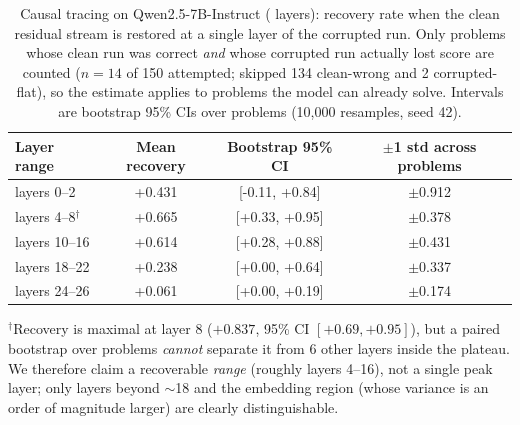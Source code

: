 \begin{table}[t]
  \centering
  \caption{Causal tracing on Qwen2.5-7B-Instruct (\nbLayers{} layers): recovery rate
           when the clean residual stream is restored at a single layer of the corrupted
           run. Only problems whose clean run was correct \emph{and} whose corrupted run
           actually lost score are counted ($n=14$ of 150 attempted;
           skipped 134 clean-wrong and
           2 corrupted-flat), so the estimate applies to
           problems the model can already solve. Intervals are bootstrap 95\% CIs over
           problems (10{,}000 resamples, seed 42).}
  \label{tab:causal}
  \small
  \begin{tabular}{@{}l c c c@{}}
    \toprule
    \textbf{Layer range} & \textbf{Mean recovery} & \textbf{Bootstrap 95\% CI} &
      \textbf{$\pm$1 std across problems} \\
    \midrule
    layers 0--2 & +0.431 & [-0.11, +0.84] & $\pm$0.912 \\
    layers 4--8$^\dagger$ & +0.665 & [+0.33, +0.95] & $\pm$0.378 \\
    layers 10--16 & +0.614 & [+0.28, +0.88] & $\pm$0.431 \\
    layers 18--22 & +0.238 & [+0.00, +0.64] & $\pm$0.337 \\
    layers 24--26 & +0.061 & [+0.00, +0.19] & $\pm$0.174 \\
    \bottomrule
  \end{tabular}
  \vspace{2pt}
  \parbox{\linewidth}{\footnotesize $^\dagger$Recovery is maximal at layer
  8 ($+0.837$, 95\% CI $[+0.69, +0.95]$),
  but a paired bootstrap over problems \emph{cannot} separate it from  6 other layers inside the
  plateau. We therefore claim a recoverable \emph{range} (roughly layers 4--16),
  not a single peak layer; only layers beyond $\sim$18 and the embedding region
  (whose variance is an order of magnitude larger) are clearly distinguishable.}
\end{table}
